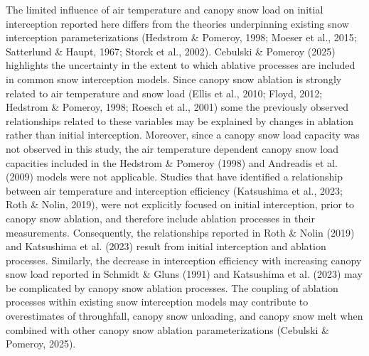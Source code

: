 \documentclass[
  letterpaper,
  DIV=11,
  numbers=noendperiod]{scrartcl}
\begin{document}
The limited influence of air temperature and canopy snow load on initial
interception reported here differs from the theories underpinning
existing snow interception parameterizations (Hedstrom \& Pomeroy, 1998;
Moeser et al., 2015; Satterlund \& Haupt, 1967; Storck et al., 2002).
Cebulski \& Pomeroy (2025) highlights the uncertainty in the extent to
which ablative processes are included in common snow interception
models. Since canopy snow ablation is strongly related to air
temperature and snow load (Ellis et al., 2010; Floyd, 2012; Hedstrom \&
Pomeroy, 1998; Roesch et al., 2001) some the previously observed
relationships related to these variables may be explained by changes in
ablation rather than initial interception. Moreover, since a canopy snow
load capacity was not observed in this study, the air temperature
dependent canopy snow load capacities included in the Hedstrom \&
Pomeroy (1998) and Andreadis et al. (2009) models were not applicable.
Studies that have identified a relationship between air temperature and
interception efficiency (Katsushima et al., 2023; Roth \& Nolin, 2019),
were not explicitly focused on initial interception, prior to canopy
snow ablation, and therefore include ablation processes in their
measurements. Consequently, the relationships reported in Roth \& Nolin
(2019) and Katsushima et al. (2023) result from initial interception and
ablation processes. Similarly, the decrease in interception efficiency
with increasing canopy snow load reported in Schmidt \& Gluns (1991) and
Katsushima et al. (2023) may be complicated by canopy snow ablation
processes. The coupling of ablation processes within existing snow
interception models may contribute to overestimates of throughfall,
canopy snow unloading, and canopy snow melt when combined with other
canopy snow ablation parameterizations (Cebulski \& Pomeroy, 2025).
\end{document}
